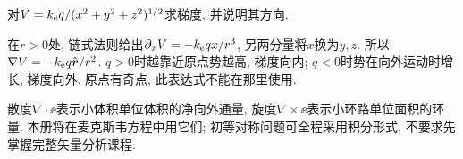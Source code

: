 \begin{example}
对$V=k_{\mathrm e} q/(x^2+y^2+z^2)^{1/2}$求梯度, 并说明其方向.
\end{example}
\begin{solution}
在$r>0$处, 链式法则给出$\partial_xV=-k_{\mathrm e} qx/r^3$, 另两分量将$x$换为$y,z$. 所以$\nabla V=-k_{\mathrm e} q\hat{\boldsymbol{r}}/r^2$. $q>0$时越靠近原点势越高, 梯度向内; $q<0$时势在向外运动时增长, 梯度向外. 原点有奇点, 此表达式不能在那里使用.
\end{solution}

散度$\nabla\cdot\ee$表示小体积单位体积的净向外通量, 旋度$\nabla\times\ee$表示小环路单位面积的环量. 本册将在麦克斯韦方程中用它们; 初等对称问题可全程采用积分形式, 不要求先掌握完整矢量分析课程.
